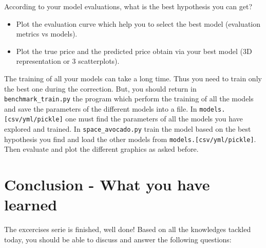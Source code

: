 \documentclass{42-en}
\begin{document}
According to your model evaluations, what is the best hypothesis you can get?
\begin{itemize}
  \item Plot the evaluation curve which help you to select the best model (evaluation metrics vs models).
  \item Plot the true price and the predicted price obtain via your best model (3D representation or 3 scatterplots).
\end{itemize}


The training of all your models can take a long time.
Thus you need to train only the best one during the correction.
But, you should return in \texttt{benchmark\_train.py} the program which perform the training of all the models and save the parameters of the different models into a file.
In \texttt{models.[csv/yml/pickle]} one must find the parameters of all the models you have explored and trained.
In \texttt{space\_avocado.py} train the model based on the best hypothesis you find and load the other models from \texttt{models.[csv/yml/pickle]}.
Then evaluate and plot the different graphics as asked before.


\newpage

\chapter{Conclusion - What you have learned}

The excercises serie is finished, well done!
Based on all the knowledges tackled today, you should be able to discuss and answer the following questions:
\end{document}
